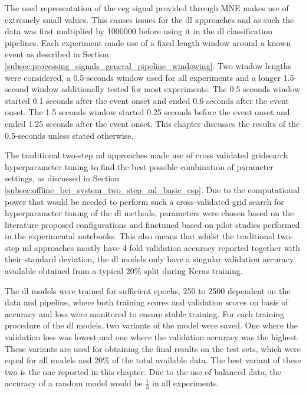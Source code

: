The used representation of the \gls{eeg} signal provided through MNE makes use of extremely small values.
This causes issues for the \gls{dl} approaches and as such the data was first multiplied by 1000000 before using it in the \gls{dl} classification pipelines.
Each experiment made use of a fixed length window around a known event as described in Section \ref{subsec:processing_signals_general_pipeline_windowing}.
Two window lengths were considered, a 0.5-seconds window used for all experiments and a longer 1.5-second window additionally tested for most experiments.
The 0.5 seconds window started 0.1 seconds after the event onset and ended 0.6 seconds after the event onset.
The 1.5 seconds window started 0.25 seconds before the event onset and ended 1.25 seconds after the event onset.
This chapter discusses the results of the 0.5-seconds unless stated otherwise.

The traditional two-step \gls{ml} approaches made use of cross validated gridsearch hyperparameter tuning to find the best possible combination of parameter settings, as discussed in Section \ref{subsec:offline_bci_system_two_step_ml_basic_csp}.
Due to the computational power that would be needed to perform such a cross-validated grid search for hyperparameter tuning of the \gls{dl} methods, parameters were chosen based on the literature proposed configurations and finetuned based on pilot studies performed in the experimental notebooks.
This also means that whilst the traditional two-step \gls{ml} approaches mostly have 4-fold validation accuracy reported together with their standard deviation, the \gls{dl} models only have a singular validation accuracy available obtained from a typical 20\% split during Keras training.

The \gls{dl} models were trained for sufficient epochs, 250 to 2500 dependent on the data and pipeline, where both training scores and validation scores on basis of accuracy and loss were monitored to ensure stable training.
For each training procedure of the \gls{dl} models, two variants of the model were saved.
One where the validation loss was lowest and one where the validation accuracy was the highest.
These variants are used for obtaining the final results on the test sets, which were equal for all models and 20\% of the total available data.
The best variant of these two is the one reported in this chapter.
Due to the use of balanced data, the accuracy of a random model would be $\frac{1}{3}$ in all experiments.

